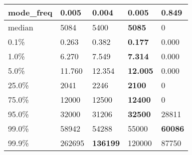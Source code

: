 \begin{table}[H]
\begin{tabular}{|l|m{10em}|m{10em}|m{10em}|m{10em}|}
\hline mode\_freq & 0.005 & 0.004 & \bfseries 0.005 & \cellcolor[rgb]{0.9, 0.54, 0.52} 0.849 \\
\hline median & 5084 & 5400 & \bfseries 5085 & \cellcolor[rgb]{0.9, 0.54, 0.52} 0 \\
\hline 0.1\% & 0.263 & 0.382 & \bfseries 0.177 & \cellcolor[rgb]{0.9, 0.54, 0.52} 0.000 \\
\hline 1.0\% & 6.270 & 7.549 & \bfseries 7.314 & \cellcolor[rgb]{0.9, 0.54, 0.52} 0.000 \\
\hline 5.0\% & 11.760 & 12.354 & \bfseries 12.005 & \cellcolor[rgb]{0.9, 0.54, 0.52} 0.000 \\
\hline 25.0\% & 2041 & 2246 & \bfseries 2100 & \cellcolor[rgb]{0.9, 0.54, 0.52} 0 \\
\hline 75.0\% & 12000 & 12500 & \bfseries 12400 & \cellcolor[rgb]{0.9, 0.54, 0.52} 0 \\
\hline 95.0\% & 32000 & 31206 & \bfseries 32500 & \cellcolor[rgb]{0.9, 0.54, 0.52} 28811 \\
\hline 99.0\% & 58942 & \cellcolor[rgb]{0.9, 0.54, 0.52} 54288 & 55000 & \bfseries 60086 \\
\hline 99.9\% & 262695 & \bfseries 136199 & 120000 & \cellcolor[rgb]{0.9, 0.54, 0.52} 87750 \\
\hline
\end{tabular}
\end{table}
